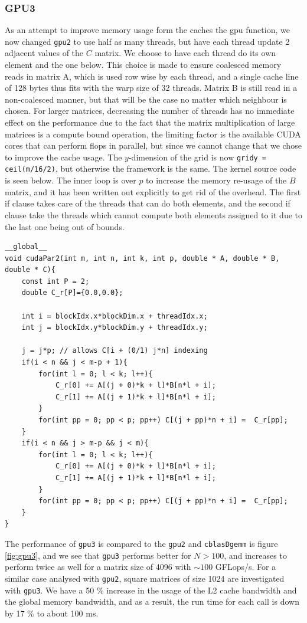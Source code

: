 \subsubsection{GPU3}
As an attempt to improve memory usage form the caches the gpu function, we now changed \texttt{gpu2} to use half as many threads, but have each thread update 2 adjacent values of the $C$ matrix. We choose to have each thread do its own element and the one below. This choice is made to ensure coalesced memory reads in matrix A, which is used row wise by each thread, and a single cache line of 128 bytes thus fits with the warp size of 32 threads. Matrix B is still read in a non-coalesced manner, but that will be the case no matter which neighbour is chosen. For larger matrices, decreasing the number of threads has no immediate effect on the performance due to the fact that the matrix multiplication of large matrices is a compute bound operation, the limiting factor is the available CUDA cores that can perform flops in parallel, but since we cannot change that we chose to improve the cache usage. The $y$-dimension of the grid is now \texttt{gridy = ceil(m/16/2)}, but otherwise the framework is the same. The kernel source code is seen below. The inner loop is over $p$ to increase the memory re-usage of the $B$ matrix, and it has been written out explicitly to get rid of the overhead. The first if clause takes care of the threads that can do both elements, and the second if clause take the threads which cannot compute both elements assigned to it due to the last one being out of bounds.

\begin{lstlisting}[caption = The source code for texttt{gpu3}. The $l$ loop is the outer loop to increase memory re-usage.]
__global__
void cudaPar2(int m, int n, int k, int p, double * A, double * B, double * C){
	const int P = 2;
	double C_r[P]={0.0,0.0};

	int i = blockIdx.x*blockDim.x + threadIdx.x;
	int j = blockIdx.y*blockDim.y + threadIdx.y;

	j = j*p; // allows C[i + (0/1) j*n] indexing
	if(i < n && j < m-p + 1){
		for(int l = 0; l < k; l++){
			C_r[0] += A[(j + 0)*k + l]*B[n*l + i];
			C_r[1] += A[(j + 1)*k + l]*B[n*l + i];
		}
		for(int pp = 0; pp < p; pp++) C[(j + pp)*n + i] =  C_r[pp];
	}
	if(i < n && j > m-p && j < m){
		for(int l = 0; l < k; l++){
			C_r[0] += A[(j + 0)*k + l]*B[n*l + i];
			C_r[1] += A[(j + 1)*k + l]*B[n*l + i];
		}
		for(int pp = 0; pp < p; pp++) C[(j + pp)*n + i] =  C_r[pp];
	}
}
\end{lstlisting}
The performance of \texttt{gpu3} is compared to the \texttt{gpu2} and \texttt{cblasDgemm} is figure \ref{fig:gpu3}, and we see that \texttt{gpu3} performs better for $N > 100$, and increases to perform twice as well for a matrix size of 4096 with $\sim 100$ GFLops/s. For a similar case analysed with \texttt{gpu2}, square matrices of size 1024 are investigated with \texttt{gpu3}. We have a 50 \% increase in the usage of the L2 cache bandwidth and the global memory bandwidth, and as a result, the run time for each call is down by 17 \% to about 100 ms.

